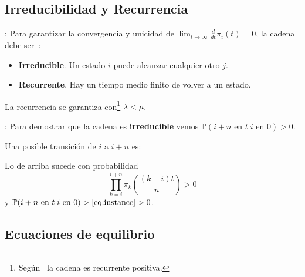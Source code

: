 \documentclass{beamer}
\begin{document}
\subsection{Irreducibilidad y Recurrencia}
\begin{frame}{\secname: \subsecname}
    Para garantizar la convergencia
    y unicidad de
    $\lim_{t\to\infty}\tfrac{d}{dt}
    \pi_i(t)=0$,
    la cadena debe ser~\cite{amable}:
    \begin{itemize}
        \item \textbf{Irreducible}.
            Un estado $i$ puede alcanzar
            cualquier otro $j$.
        \item \textbf{Recurrente}.
            Hay un tiempo medio finito
            de volver a un estado.
    \end{itemize}

    \vfill

    La recurrencia se garantiza
    con\footnote{Según~\cite{recurrent}
    la cadena es recurrente positiva.} $\lambda<\mu$.

\end{frame}



\begin{frame}{\secname: \subsecname}
    Para demostrar que la cadena es
    \textbf{irreducible} vemos
    $\mathbb{P}(i+n \text{ en } t
    | i \text{ en } 0)>0$.

    \vfill

    Una posible transición de $i$
    a $i+n$ es:
    
    \begin{figure}
         \resizebox{.8\textwidth}{!}{%
         }
    \end{figure}


    \vfill

    Lo de arriba sucede con probabilidad
    \begin{equation}
        \prod_{k=i}^{i+n} \pi_k\left(
            \frac{(k-i)t}{n}
        \right) > 0
        \label{eq:instance}
    \end{equation}
    y $\mathbb{P}(i+n \text{ en } t
    | i \text{ en } 0)>\eqref{eq:instance}
    >0$.
\end{frame}








\subsection{Ecuaciones de equilibrio}
\end{document}
